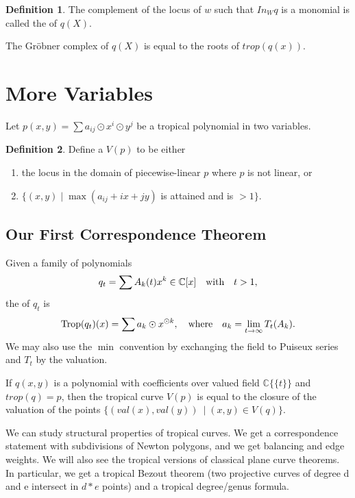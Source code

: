 \documentclass[12pt]{memoir}
\DeclareMathOperator{\Trop}{Trop}
\theoremstyle{definition}
\newtheorem{protodefinition}{Definition}[section]
\newenvironment{define}
   {\begin{protodefinition}}
   {\end{protodefinition}}
\def\CC{{\mathbb C}}
\begin{document}
\begin{define}
    The complement of the locus of $w$ such that $In_W q$ is a monomial is called the  of $q(X)$.
\end{define}

The Gr\"obner complex of $q(X)$ is equal to the roots of $trop(q(x))$.


\section{More Variables}


Let $p(x,y)= \sum a_{ij} \odot x^i\odot y^j$ be a tropical polynomial in two variables. 

\begin{define}
    Define a  $V(p)$ to be either
    \begin{enumerate}
        \item the locus in the domain of piecewise-linear $p$ where $p$ is not linear, or
        \item $\{(x,y)\; |\; \max(a_{ij} +ix+jy)$ is attained and is $>1\}$.
    \end{enumerate}
\end{define}

\subsection{Our First Correspondence Theorem}

\begin{Def}
    Given a family of polynomials 
    $$q_t=\sum A_k(t)x^k\in\mathbb{C}[x]\quad\text{with}\quad t>1,$$
    the  of $q_t$ is 
    $$\Trop(q_t)(x)=\sum a_k\odot x^{\odot k},\word{where}a_k=\lim_{t\to\infty}T_t(A_k).$$
    We may also use the $\min$ convention by exchanging the field to Puiseux series and $T_t$ by the valuation.
\end{Def}

\begin{Th}
    If $q(x,y)$ is a polynomial with coefficients over valued field $\CC\{\{t\}\}$ and $trop (q) = p$, then the tropical curve $V(p)$ is equal to the closure of the valuation of the points $\{(val(x), val(y)) \:\; |\; (x,y) \in V(q)\}$.
\end{Th}

We can study structural properties of tropical curves. We get a correspondence statement with subdivisions of Newton polygons, and we get balancing and edge weights.  We will also see the tropical versions of classical plane curve theorems. In particular, we get a tropical Bezout theorem (two projective curves of degree d and e intersect in $d*e$ points) and a tropical degree/genus formula.
\end{document}
